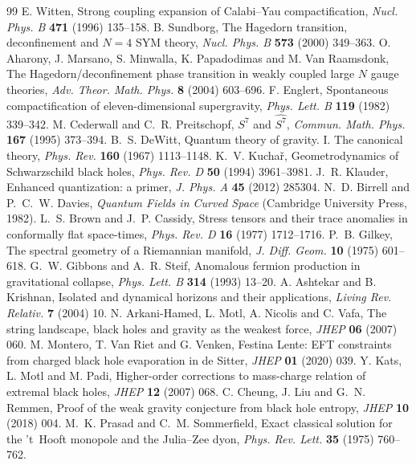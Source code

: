 \begin{thebibliography}{99}
 E. Witten, Strong coupling expansion of Calabi--Yau compactification, \emph{Nucl. Phys. B} \textbf{471} (1996) 135--158.
 B. Sundborg, The Hagedorn transition, deconfinement and $N=4$ SYM theory, \emph{Nucl. Phys. B} \textbf{573} (2000) 349--363.
 O. Aharony, J. Marsano, S. Minwalla, K. Papadodimas and M. Van Raamsdonk, The Hagedorn/deconfinement phase transition in weakly coupled large $N$ gauge theories, \emph{Adv. Theor. Math. Phys.} \textbf{8} (2004) 603--696.
 F. Englert, Spontaneous compactification of eleven-dimensional supergravity, \emph{Phys. Lett. B} \textbf{119} (1982) 339--342.
 M. Cederwall and C.~R. Preitschopf, $S^7$ and $\widehat{S^7}$, \emph{Commun. Math. Phys.} \textbf{167} (1995) 373--394.
 B.~S. DeWitt, Quantum theory of gravity. I. The canonical theory, \emph{Phys. Rev.} \textbf{160} (1967) 1113--1148.
 K.~V. Kucha\v{r}, Geometrodynamics of Schwarzschild black holes, \emph{Phys. Rev. D} \textbf{50} (1994) 3961--3981.
 J.~R. Klauder, Enhanced quantization: a primer, \emph{J. Phys. A} \textbf{45} (2012) 285304.
 N.~D. Birrell and P.~C.~W. Davies, \emph{Quantum Fields in Curved Space} (Cambridge University Press, 1982).
 L.~S. Brown and J.~P. Cassidy, Stress tensors and their trace anomalies in conformally flat space-times, \emph{Phys. Rev. D} \textbf{16} (1977) 1712--1716.
 P.~B. Gilkey, The spectral geometry of a Riemannian manifold, \emph{J. Diff. Geom.} \textbf{10} (1975) 601--618.
 G.~W. Gibbons and A.~R. Steif, Anomalous fermion production in gravitational collapse, \emph{Phys. Lett. B} \textbf{314} (1993) 13--20.
 A. Ashtekar and B. Krishnan, Isolated and dynamical horizons and their applications, \emph{Living Rev. Relativ.} \textbf{7} (2004) 10.
 N. Arkani-Hamed, L. Motl, A. Nicolis and C. Vafa, The string landscape, black holes and gravity as the weakest force, \emph{JHEP} \textbf{06} (2007) 060.
 M. Montero, T. Van Riet and G. Venken, Festina Lente: EFT constraints from charged black hole evaporation in de Sitter, \emph{JHEP} \textbf{01} (2020) 039.
 Y. Kats, L. Motl and M. Padi, Higher-order corrections to mass-charge relation of extremal black holes, \emph{JHEP} \textbf{12} (2007) 068.
 C. Cheung, J. Liu and G.~N. Remmen, Proof of the weak gravity conjecture from black hole entropy, \emph{JHEP} \textbf{10} (2018) 004.
 M.~K. Prasad and C.~M. Sommerfield, Exact classical solution for the 't~Hooft monopole and the Julia--Zee dyon, \emph{Phys. Rev. Lett.} \textbf{35} (1975) 760--762.
\end{thebibliography}
